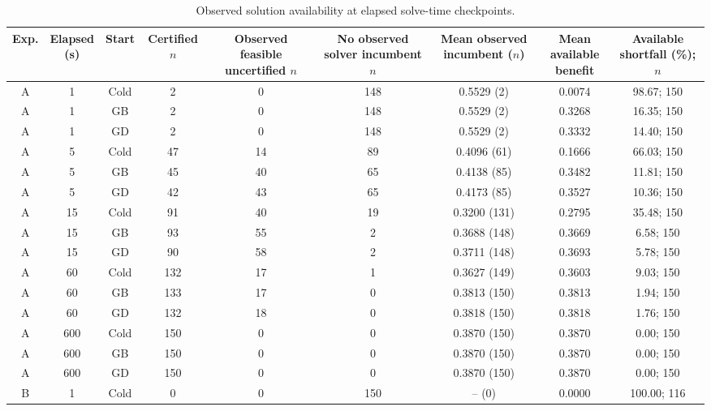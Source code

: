 \begin{table}[!htbp]
\centering
\caption{Observed solution availability at elapsed solve-time checkpoints.}
\label{tab:AB-observed-budget}
\scriptsize
\setlength{\tabcolsep}{2.8pt}
\renewcommand{\arraystretch}{1.08}
\begin{tabular}{@{}ccccccccc@{}}
\toprule
Exp. & \makecell{Elapsed\\(s)} & Start & \makecell{Certified\\$n$} & \makecell{Observed feasible\\uncertified $n$} & \makecell{No observed solver\\incumbent $n$} & \makecell{Mean observed\\incumbent ($n$)} & \makecell{Mean available\\benefit} & \makecell{Available shortfall\\(\%); $n$} \\
\midrule
A & 1 & Cold & 2 & 0 & 148 & 0.5529 (2) & 0.0074 & 98.67; 150 \\
A & 1 & GB & 2 & 0 & 148 & 0.5529 (2) & 0.3268 & 16.35; 150 \\
A & 1 & GD & 2 & 0 & 148 & 0.5529 (2) & 0.3332 & 14.40; 150 \\
A & 5 & Cold & 47 & 14 & 89 & 0.4096 (61) & 0.1666 & 66.03; 150 \\
A & 5 & GB & 45 & 40 & 65 & 0.4138 (85) & 0.3482 & 11.81; 150 \\
A & 5 & GD & 42 & 43 & 65 & 0.4173 (85) & 0.3527 & 10.36; 150 \\
A & 15 & Cold & 91 & 40 & 19 & 0.3200 (131) & 0.2795 & 35.48; 150 \\
A & 15 & GB & 93 & 55 & 2 & 0.3688 (148) & 0.3669 & 6.58; 150 \\
A & 15 & GD & 90 & 58 & 2 & 0.3711 (148) & 0.3693 & 5.78; 150 \\
A & 60 & Cold & 132 & 17 & 1 & 0.3627 (149) & 0.3603 & 9.03; 150 \\
A & 60 & GB & 133 & 17 & 0 & 0.3813 (150) & 0.3813 & 1.94; 150 \\
A & 60 & GD & 132 & 18 & 0 & 0.3818 (150) & 0.3818 & 1.76; 150 \\
A & 600 & Cold & 150 & 0 & 0 & 0.3870 (150) & 0.3870 & 0.00; 150 \\
A & 600 & GB & 150 & 0 & 0 & 0.3870 (150) & 0.3870 & 0.00; 150 \\
A & 600 & GD & 150 & 0 & 0 & 0.3870 (150) & 0.3870 & 0.00; 150 \\
\midrule
B & 1 & Cold & 0 & 0 & 150 & -- (0) & 0.0000 & 100.00; 116 \\

\end{tabular}
\end{table}
